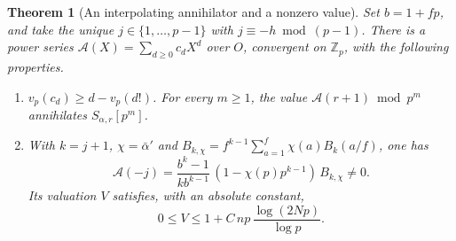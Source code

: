 \documentclass[a4paper,11pt]{article}
\newtheorem{theorem}[proposition]{Theorem}
\theoremstyle{definition}
\theoremstyle{remark}
\newcommand{\ZZ}{\mathbb Z}\newcommand{\ord}{\operatorname{ord}}
\numberwithin{equation}{section}
\begin{document}
\begin{theorem}[An interpolating annihilator and a nonzero value]
\label{thm:moment141}
Set \(b=1+fp\), and take the unique \(j\in\{1,\ldots,p-1\}\)
with \(j\equiv-h\bmod(p-1)\). There is a power series
\(\mathcal A(X)=\sum_{d\ge0}c_d X^d\) over \(O\), convergent
on \(\ZZ_p\), with the following properties.
\begin{enumerate}
\item \(v_p(c_d)\ge d-v_p(d!)\). For every \(m\ge1\),
the value \(\mathcal A(r+1)\bmod p^m\) annihilates
\(S_{\alpha,r}[p^m]\).
\item With \(k=j+1\), \(\chi=\bar\alpha'\) and
\(B_{k,\chi}=f^{k-1}\sum_{a=1}^f\chi(a)B_k(a/f)\), one has
\begin{equation}
  \mathcal A(-j)=
     \frac{b^k-1}{k b^{k-1}}\,(1-\chi(p)p^{k-1})\, B_{k,\chi}
      \ne0. \label{eq:moment141}
\end{equation}
Its valuation \(V\) satisfies, with an absolute constant,
\begin{equation}
     0\le V\le 1+C\, n p\,\frac{\log(2Np)}{\log p}.
     \label{eq:V141}
\end{equation}
\end{enumerate}
\end{theorem}
\end{document}
